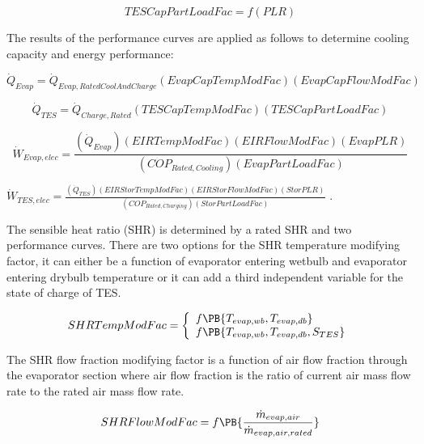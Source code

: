 \begin{equation}
TESCapPartLoadFac = f\left( {PLR} \right)
\end{equation}

The results of the performance curves are applied as follows to determine cooling capacity and energy performance:

\begin{equation}
{\dot Q_{Evap}} = {\dot Q_{Evap,RatedCoolAndCharge}}\left( {EvapCapTempModFac} \right)\left( {EvapCapFlowModFac} \right)
\end{equation}

\begin{equation}
{\dot Q_{TES}} = {\dot Q_{Charge,Rated}}\left( {TESCapTempModFac} \right)\left( {TESCapPartLoadFac} \right)
\end{equation}

\begin{equation}
{\dot W_{Evap,elec}} = \frac{{\left( {{{\dot Q}_{Evap}}} \right)\left( {EIRTempModFac} \right)\left( {EIRFlowModFac} \right)\left( {EvapPLR} \right)}}{{\left( {CO{P_{Rated,Cooling}}} \right)\left( {EvapPartLoadFac} \right)}}
\end{equation}

\({\dot W_{TES,elec}} = \frac{{\left( {{{\dot Q}_{TES}}} \right)\left( {EIRStorTempModFac} \right)\left( {EIRStorFlowModFac} \right)\left( {StorPLR} \right)}}{{\left( {CO{P_{Rated,Charging}}} \right)\left( {StorPartLoadFac} \right)}}\) .

The sensible heat ratio (SHR) is determined by a rated SHR and two performance curves. There are two options for the SHR temperature modifying factor, it can either be a function of evaporator entering wetbulb and evaporator entering drybulb temperature or it can add a third independent variable for the state of charge of TES.

\begin{equation}
  SHRTempModFac = \left\{
    \begin{array}{l}
      f\PB{T_{evap,wb},T_{evap,db}} \\
      f\PB{T_{evap,wb},T_{evap,db},S_{TES}}
    \end{array}
  \right.
\end{equation}

The SHR flow fraction modifying factor is a function of air flow fraction through the evaporator section where air flow fraction is the ratio of current air mass flow rate to the rated air mass flow rate.

\begin{equation}
SHRFlowModFac = f\PB{\frac{\dot{m}_{evap,air}}{\dot{m}_{evap,air,rated}}}
\end{equation}

